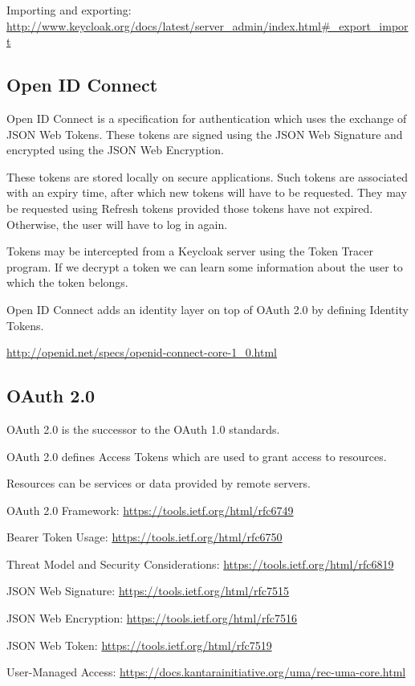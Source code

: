 \documentclass{article}
\begin{document}
Importing and exporting:
\url{http://www.keycloak.org/docs/latest/server_admin/index.html#_export_import}

\subsection{Open ID Connect}

Open ID Connect is a specification for authentication
which uses the exchange of JSON Web Tokens.
These tokens are signed using the JSON Web Signature
and encrypted using the JSON Web Encryption.

These tokens are stored locally on secure applications.
Such tokens are associated with an expiry time, after which
new tokens will have to be requested.
They may be requested using Refresh tokens provided
those tokens have not expired. Otherwise, the user 
will have to log in again.

Tokens may be intercepted from a Keycloak server using the Token Tracer program. If we decrypt a token we can learn some information about the user to which the token belongs.

Open ID Connect adds an identity layer on top of OAuth 2.0 
by defining Identity Tokens.

\url{http://openid.net/specs/openid-connect-core-1_0.html}

\subsection{OAuth 2.0}

OAuth 2.0 is the successor to the OAuth 1.0 standards.

OAuth 2.0 defines Access Tokens
which are used to grant access to resources.

Resources can be services or data provided by remote servers.

OAuth 2.0 Framework:
\url{https://tools.ietf.org/html/rfc6749}

Bearer Token Usage:
\url{https://tools.ietf.org/html/rfc6750}

Threat Model and Security Considerations:
\url{https://tools.ietf.org/html/rfc6819}

JSON Web Signature:
\url{https://tools.ietf.org/html/rfc7515}

JSON Web Encryption:
\url{https://tools.ietf.org/html/rfc7516}

JSON Web Token:
\url{https://tools.ietf.org/html/rfc7519}

User-Managed Access:
\url{https://docs.kantarainitiative.org/uma/rec-uma-core.html}
\end{document}
